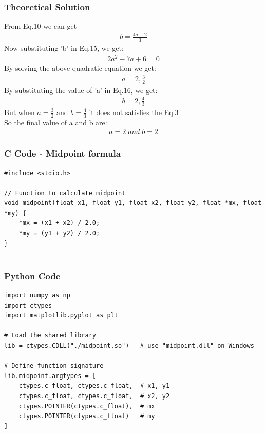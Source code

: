 \documentclass{beamer}
\begin{document}
\begin{frame}
\frametitle{Theoretical Solution}

From Eq.10 we can get
\begin{align}
    b=\frac{4a-2}{3}
\end{align}
Now substituting 'b' in Eq.15, we get:
\begin{align}
2a^2-7a+6=0
\end{align}
By solving the above quadratic equation we get:
\begin{align}
a=2,\frac{3}{2}
\end{align}
By substituting the value of 'a' in Eq.16, we get:
\begin{align}
b=2,\frac{4}{3}
\end{align}
But when $a=\frac{3}{2}$ and $b=\frac{4}{3}$ it does not satisfies the Eq.3\\
So the final value of a and b are:
\begin{align}
    a=2\;and\;b=2
\end{align}
\end{frame}


\begin{frame}[fragile]
    \frametitle{C Code - Midpoint formula }

    \begin{lstlisting}
#include <stdio.h>

// Function to calculate midpoint
void midpoint(float x1, float y1, float x2, float y2, float *mx, float *my) {
    *mx = (x1 + x2) / 2.0;
    *my = (y1 + y2) / 2.0;
}


    \end{lstlisting}
\end{frame}


\begin{frame}[fragile]
    \frametitle{Python Code}
    \begin{lstlisting}
import numpy as np
import ctypes
import matplotlib.pyplot as plt

# Load the shared library
lib = ctypes.CDLL("./midpoint.so")   # use "midpoint.dll" on Windows

# Define function signature
lib.midpoint.argtypes = [
    ctypes.c_float, ctypes.c_float,  # x1, y1
    ctypes.c_float, ctypes.c_float,  # x2, y2
    ctypes.POINTER(ctypes.c_float),  # mx
    ctypes.POINTER(ctypes.c_float)   # my
]






    \end{lstlisting}
\end{frame}
\end{document}
